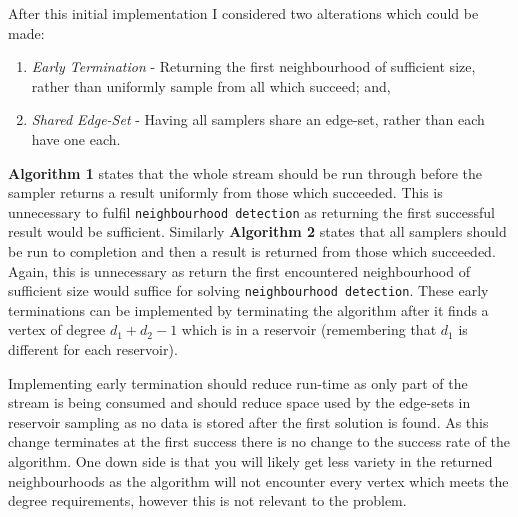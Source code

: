 \documentclass[11pt,twoside,a4paper]{report}
\begin{document}
\noindent After this initial implementation I considered two alterations which could be made:
\begin{enumerate}
	\item \textit{Early Termination} - Returning the first neighbourhood of sufficient size, rather than uniformly sample from all which succeed; and,
	\item \textit{Shared Edge-Set} - Having all samplers share an edge-set, rather than each have one each.
\end{enumerate}

\textbf{Algorithm 1} states that the whole stream should be run through before the sampler returns a result uniformly from those which succeeded. This is unnecessary to fulfil \texttt{neighbourhood detection} as returning the first successful result would be sufficient. Similarly \textbf{Algorithm 2} states that all samplers should be run to completion and then a result is returned from those which succeeded. Again, this is unnecessary as return the first encountered neighbourhood of sufficient size would suffice for solving \texttt{neighbourhood detection}. These early terminations can be implemented by terminating the algorithm after it finds a vertex of degree $d_1+d_2-1$ which is in a reservoir (remembering that $d_1$ is different for each reservoir).

\par Implementing early termination should reduce run-time as only part of the stream is being consumed and should reduce space used by the edge-sets in reservoir sampling as no data is stored after the first solution is found. As this change terminates at the first success there is no change to the success rate of the algorithm. One down side is that you will likely get less variety in the returned neighbourhoods as the algorithm will not encounter every vertex which meets the degree requirements, however this is not relevant to the problem.
\end{document}
